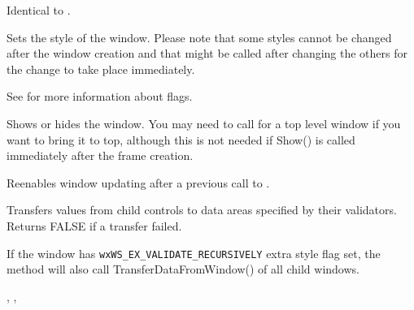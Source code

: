 Identical to .

\label{wxwindowsetwindowstyleflag}


Sets the style of the window. Please note that some styles cannot be changed
after the window creation and that  might
be called after changing the others for the change to take place immediately.

See  for more information about flags.



\label{wxwindowshow}


Shows or hides the window. You may need to call  
for a top level window if you want to bring it to top, although this is not
needed if Show() is called immediately after the frame creation.





\label{wxwindowthaw}


Reenables window updating after a previous call to 
.

\label{wxwindowtransferdatafromwindow}


Transfers values from child controls to data areas specified by their validators. Returns
FALSE if a transfer failed.

If the window has {\tt wxWS\_EX\_VALIDATE\_RECURSIVELY} extra style flag set,
the method will also call TransferDataFromWindow() of all child windows.


,\rtfsp
{}, 

